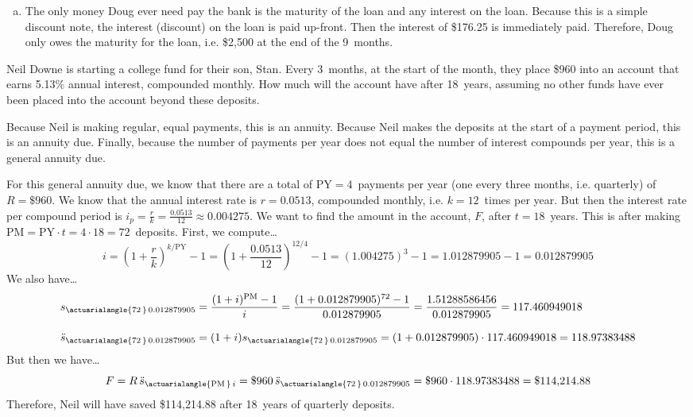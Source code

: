 \documentclass[12pt,letterpaper]{exam}
\begin{document}
\begin{questions}
\begin{enumerate}[(a)]
\item The only money Doug ever need pay the bank is the maturity of the loan and any interest on the loan. Because this is a simple discount note, the interest (discount) on the loan is paid up-front. Then the interest of \$176.25 is immediately paid. Therefore, Doug only owes the maturity for the loan, i.e. \$2,500 at the end of the 9~months. 
\end{enumerate}



\newpage
\question[15] Neil Downe is starting a college fund for their son, Stan. Every 3~months, at the start of the month, they place \$960 into an account that earns 5.13\% annual interest, compounded monthly. How much will the account have after 18~years, assuming no other funds have ever been placed into the account beyond these deposits. \pspace

\sol Because Neil is making regular, equal payments, this is an annuity. Because Neil makes the deposits at the start of a payment period, this is an annuity due. Finally, because the number of payments per year does not equal the number of interest compounds per year, this is a general annuity due. \pspace

For this general annuity due, we know that there are a total of $\text{PY}= 4$~payments per year (one every three months, i.e. quarterly) of $R= \$960$. We know that the annual interest rate is $r= 0.0513$, compounded monthly, i.e. $k= 12$~times per year. But then the interest rate per compound period is $i_p= \frac{r}{k}= \frac{0.0513}{12} \approx  0.004275$. We want to find the amount in the account, $F$, after $t= 18$~years. This is after making $\text{PM}= \text{PY} \cdot t= 4 \cdot 18= 72$~deposits. First, we compute\dots 
	\[
	i= \left( 1 + \dfrac{r}{k} \right)^{k/\text{PY}} - 1= \left(1 + \dfrac{0.0513}{12} \right)^{12/4} - 1= (1.004275)^3 - 1= 1.012879905 - 1= 0.012879905
	\] \pspace
We also have\dots
	\[
	\begin{aligned}
	s_{\actuarialangle{72\,}\, 0.012879905}&= \dfrac{(1 + i)^{\text{PM}} - 1}{i}= \dfrac{(1 + 0.012879905)^{72} - 1}{0.012879905}= \dfrac{1.51288586456}{0.012879905}= 117.460949018 \\[0.3cm]
	\ddot{s}_{\actuarialangle{72\,}\, 0.012879905}&= (1 + i) s_{\actuarialangle{72\,}\, 0.012879905}= (1 + 0.012879905) \cdot 117.460949018= 118.97383488
	\end{aligned}
	\] \pspace
But then we have\dots
	\[
	F= R\, \ddot{s}_{\actuarialangle{\text{PM}\,}\, i}= \$960\, \ddot{s}_{\actuarialangle{72\,}\, 0.012879905}= \$960 \cdot 118.97383488= \$114,\!214.88
	\] \pspace
Therefore, Neil will have saved \$114,214.88 after 18~years of quarterly deposits. 


\end{questions}
\end{document}
